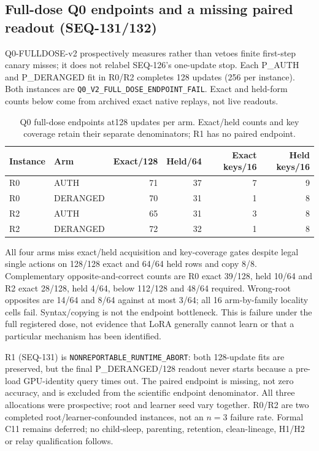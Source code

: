 \documentclass[11pt]{article}
\begin{document}
\subsection{Full-dose Q0 endpoints and a missing paired readout (SEQ-131/132)}
Q0-FULLDOSE-v2 prospectively measures rather than vetoes finite first-step
canary misses; it does not relabel SEQ-126's one-update stop. Each P\_AUTH and
P\_DERANGED fit in R0/R2 completes 128 updates (256 per instance). Both instances
are \texttt{Q0\_V2\_FULL\_DOSE\_ENDPOINT\_FAIL}. Exact and held-form counts
below come from archived exact native replays, not live readouts.

\begin{table}[ht]
\centering
\caption{Q0 full-dose endpoints at128 updates per arm. Exact/held counts and
key coverage retain their separate denominators; R1 has no paired endpoint.}
\begin{tabular}{llrrrr}
\toprule
Instance & Arm & Exact/128 & Held/64 & Exact keys/16 & Held keys/16 \\
\midrule
R0 & AUTH & 71 & 37 & 7 & 9 \\
R0 & DERANGED & 70 & 31 & 1 & 8 \\
R2 & AUTH & 65 & 31 & 3 & 8 \\
R2 & DERANGED & 72 & 32 & 1 & 8 \\
\bottomrule
\end{tabular}
\end{table}

All four arms miss exact/held acquisition and key-coverage gates despite legal
single actions on 128/128 exact and 64/64 held rows and copy 8/8. Complementary
opposite-and-correct counts are R0 exact 39/128, held 10/64 and R2 exact 28/128,
held 4/64, below 112/128 and 48/64 required. Wrong-root opposites are 14/64 and 8/64
against at most 3/64; all 16 arm-by-family locality cells fail. Syntax/copying is
not the endpoint bottleneck. This is failure under the full registered dose,
not evidence that LoRA generally cannot learn or that a particular mechanism
has been identified.

R1 (SEQ-131) is \texttt{NONREPORTABLE\_RUNTIME\_ABORT}: both 128-update fits
are preserved, but the final P\_DERANGED/128 readout never starts because a
pre-load GPU-identity query times out. The paired endpoint is missing, not zero
accuracy, and is excluded from the scientific endpoint denominator. All three
allocations were prospective; root and learner seed vary together. R0/R2 are
two completed root/learner-confounded instances, not an $n=3$ failure rate.
Formal C11 remains deferred; no child-sleep, parenting, retention, clean-lineage,
H1/H2 or relay qualification follows.
\end{document}
